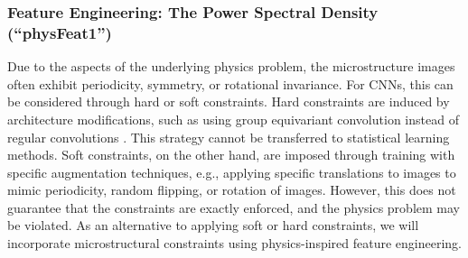 \documentclass[11pt, authoryear]{elsarticle}
\begin{document}
	\subsubsection{Feature Engineering: The Power Spectral Density (``physFeat1'')}
	\label{sec:PSDfeat}
	Due to the aspects of the underlying physics problem, the microstructure images often 
	exhibit periodicity, symmetry, or rotational invariance. For CNNs, this can be
	considered through hard or soft constraints. Hard constraints are induced by 
	architecture modifications, such as using group equivariant convolution 
	instead of regular convolutions \citep{cohen2016group}. This strategy cannot
	be transferred to statistical learning methods. 	
	Soft constraints, on the other hand, are imposed through training with specific
	augmentation techniques, e.g., applying specific translations to images to mimic 
	periodicity, random flipping, or rotation of images. However, this does not 
	guarantee that the constraints are exactly enforced, and the physics problem
	may be violated. 
	As an alternative to applying soft or hard constraints, we will incorporate
	microstructural constraints using physics-inspired feature engineering. 
	
\end{document}
